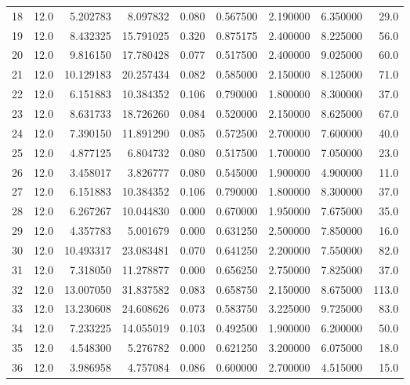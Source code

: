 \begin{tabular}{lrrrrrrrr}
18   &   12.0 &   5.202783 &   8.097832 &  0.080 &  0.567500 &  2.190000 &   6.350000 &   29.0 \\
19   &   12.0 &   8.432325 &  15.791025 &  0.320 &  0.875175 &  2.400000 &   8.225000 &   56.0 \\
20   &   12.0 &   9.816150 &  17.780428 &  0.077 &  0.517500 &  2.400000 &   9.025000 &   60.0 \\
21   &   12.0 &  10.129183 &  20.257434 &  0.082 &  0.585000 &  2.150000 &   8.125000 &   71.0 \\
22   &   12.0 &   6.151883 &  10.384352 &  0.106 &  0.790000 &  1.800000 &   8.300000 &   37.0 \\
23   &   12.0 &   8.631733 &  18.726260 &  0.084 &  0.520000 &  2.150000 &   8.625000 &   67.0 \\
24   &   12.0 &   7.390150 &  11.891290 &  0.085 &  0.572500 &  2.700000 &   7.600000 &   40.0 \\
25   &   12.0 &   4.877125 &   6.804732 &  0.080 &  0.517500 &  1.700000 &   7.050000 &   23.0 \\
26   &   12.0 &   3.458017 &   3.826777 &  0.080 &  0.545000 &  1.900000 &   4.900000 &   11.0 \\
27   &   12.0 &   6.151883 &  10.384352 &  0.106 &  0.790000 &  1.800000 &   8.300000 &   37.0 \\
28   &   12.0 &   6.267267 &  10.044830 &  0.000 &  0.670000 &  1.950000 &   7.675000 &   35.0 \\
29   &   12.0 &   4.357783 &   5.001679 &  0.000 &  0.631250 &  2.500000 &   7.850000 &   16.0 \\
30   &   12.0 &  10.493317 &  23.083481 &  0.070 &  0.641250 &  2.200000 &   7.550000 &   82.0 \\
31   &   12.0 &   7.318050 &  11.278877 &  0.000 &  0.656250 &  2.750000 &   7.825000 &   37.0 \\
32   &   12.0 &  13.007050 &  31.837582 &  0.083 &  0.658750 &  2.150000 &   8.675000 &  113.0 \\
33   &   12.0 &  13.230608 &  24.608626 &  0.073 &  0.583750 &  3.225000 &   9.725000 &   83.0 \\
34   &   12.0 &   7.233225 &  14.055019 &  0.103 &  0.492500 &  1.900000 &   6.200000 &   50.0 \\
35   &   12.0 &   4.548300 &   5.276782 &  0.000 &  0.621250 &  3.200000 &   6.075000 &   18.0 \\
36   &   12.0 &   3.986958 &   4.757084 &  0.086 &  0.600000 &  2.700000 &   4.515000 &   15.0 \\

\end{tabular}
